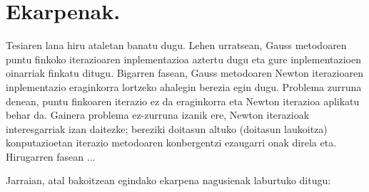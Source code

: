 \section{Ekarpenak.}

Tesiaren lana hiru ataletan banatu dugu. Lehen urratsean, Gauss metodoaren puntu finkoko iterazioaren inplementazioa aztertu dugu eta gure inplementazioen oinarriak finkatu ditugu. Bigarren fasean, Gauss metodoaren Newton iterazioaren inplementazio eraginkorra lortzeko ahalegin berezia egin dugu. Problema zurruna denean, puntu finkoaren iterazio ez da eraginkorra eta Newton iterazioa aplikatu behar da. Gainera problema ez-zurruna izanik ere, Newton iterazioak interesgarriak izan daitezke; bereziki doitasun altuko (doitasun
laukoitza) konputazioetan iterazio metodoaren konbergentzi ezaugarri onak direla eta.  Hirugarren fasean ...

Jarraian, atal bakoitzean egindako ekarpena nagusienak laburtuko ditugu:

